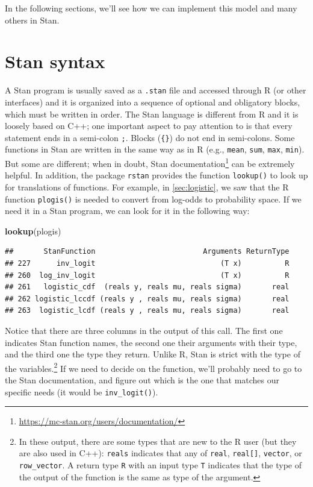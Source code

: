 \documentclass[12pt,]{krantz}
\newenvironment{Shaded}{\begin{snugshade}}{\end{snugshade}}
\newcommand{\KeywordTok}[1]{\textcolor[rgb]{0.13,0.29,0.53}{\textbf{#1}}}
\newcommand{\NormalTok}[1]{#1}
\renewcommand{\href}[2]{#2\footnote{\url{#1}}}
\theoremstyle{definition}
\theoremstyle{definition}
\theoremstyle{definition}
\theoremstyle{remark}
\begin{document}
In the following sections, we'll see how we can implement this model and many others in Stan.

\hypertarget{stan-syntax}{%
\section{Stan syntax}\label{stan-syntax}}

A Stan program is usually saved as a \texttt{.stan} file and accessed through R (or other interfaces) and it is organized into a sequence of optional and obligatory blocks, which must be written in order. The Stan language is different from R and it is loosely based on C++; one important aspect to pay attention to is that every statement ends in a semi-colon \texttt{;}. Blocks (\texttt{\{\}}) do not end in semi-colons. Some functions in Stan are written in the same way as in R (e.g., \texttt{mean}, \texttt{sum}, \texttt{max}, \texttt{min}). But some are different; when in doubt, \href{https://mc-stan.org/users/documentation/}{Stan documentation} can be extremely helpful. In addition, the package \texttt{rstan} provides the function \texttt{lookup()} to look up for translations of functions. For example, in \ref{sec:logistic}, we saw that the R function \texttt{plogis()} is needed to convert from log-odds to probability space. If we need it in a Stan program, we can look for it in the following way:

\begin{Shaded}
\begin{Highlighting}[]
\KeywordTok{lookup}\NormalTok{(plogis)}
\end{Highlighting}
\end{Shaded}

\begin{verbatim}
##       StanFunction                         Arguments ReturnType
## 227      inv_logit                             (T x)          R
## 260  log_inv_logit                             (T x)          R
## 261   logistic_cdf  (reals y, reals mu, reals sigma)       real
## 262 logistic_lccdf (reals y , reals mu, reals sigma)       real
## 263  logistic_lcdf (reals y , reals mu, reals sigma)       real
\end{verbatim}

Notice that there are three columns in the output of this call. The first one indicates Stan function names, the second one their arguments with their type, and the third one the type they return. Unlike R, Stan is strict with the type of the variables.\footnote{In these output, there are some types that are new to the R user (but they are also used in C++): \texttt{reals} indicates that any of \texttt{real}, \texttt{real{[}{]}}, \texttt{vector}, or \texttt{row\_vector}. A return type \texttt{R} with an input type \texttt{T} indicates that the type of the output of the function is the same as type of the argument.} If we need to decide on the function, we'll probably need to go to the Stan documentation, and figure out which is the one that matches our specific needs (it would be \texttt{inv\_logit()}).
\end{document}
